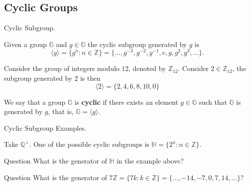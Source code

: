 \documentclass{beamer}
\begin{document}
  \subsection{Cyclic Groups}

  \begin{frame}{Cyclic Subgroup.}
    \begin{definition}
      Given a group $\mathbb{G}$ and $g \in \mathbb{G}$ the cyclic subgroup generated by $g$ is
      \begin{equation*}
          \langle g \rangle = \{g^n: n \in \mathbb{Z}\} = \{\dots,g^{-3}, g^{-2}, g^{-1}, e, g, g^2, g^3, \dots\}.
      \end{equation*}
    \end{definition}
  
    \begin{example}
        Consider the group of integers modulo $12$, denoted by $\mathbb{Z}_{12}$. Consider $2 \in \mathbb{Z}_{12}$, the subgroup generated by $2$ is then
        \begin{equation*}
            \langle 2 \rangle = \{2,4,6,8,10, 0\}
        \end{equation*}
    \end{example}

    \begin{definition}
      We say that a group $\mathbb{G}$ is \textbf{cyclic} if there exists an element $g \in \mathbb{G}$ such that $\mathbb{G}$ is generated by $g$, that is, $\mathbb{G} = \langle g \rangle$.
    \end{definition}
  \end{frame}

  \begin{frame}{Cyclic Subgroup Examples.}
    \begin{example}
      Take $\mathbb{Q}^{\times}$. One of the possible cyclic subgroups is $\mathbb{H}=\{2^n: n \in \mathbb{Z}\}$. 
    \end{example}

    \begin{alertblock}{Question}
      What is the generator of $\mathbb{H}$ in the example above?
    \end{alertblock}

    \begin{alertblock}{Question}
      What is the generator of $7\mathbb{Z} = \{7k: k \in \mathbb{Z}\} = \{\dots,-14,-7,0,7,14,\dots\}$?
    \end{alertblock}
  \end{frame}
\end{document}
